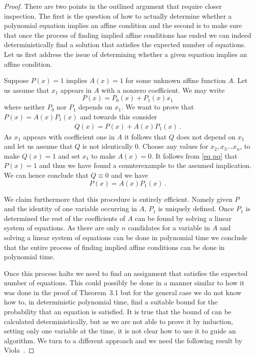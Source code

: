 \begin{proof}
There are two points in the outlined argument
that require closer inspection.  The
first is the question of how to actually determine whether a 
polynomial equation implies an affine condition
and the second is to make sure that once
the process of finding implied affine conditions
has ended we can indeed deterministically find a
solution that satisfies the expected number of
equations.
Let us first address the issue of determining
whether a given equation implies an affine
condition.

Suppose $P(x)=1$ implies $A(x)=1$
for some unknown affine function $A$.
Let us assume that $x_1$ appears in $A$ with
a nonzero coefficient.  
We may write
$$
P(x)=P_0(x)+P_1(x)x_1$$
where neither $P_0$ nor $P_1$ depends on $x_1$.  We want
to prove that $P(x)=A(x)P_1(x)$ and towards this consider
\begin{eqnarray}\label{eq pq}
Q(x)=P(x)+A(x)P_1(x)\,.
\end{eqnarray}
As $x_1$ appears with coefficient one in $A$ it follows
that $Q$ does not depend on $x_1$ and let us assume that
$Q$ is not identically 0.  Choose any values
for $x_2, x_3 \ldots x_n$, to make $Q(x)=1$
and set $x_1$ to make $A(x)=0$.  It follows
from \eqref{eq pq} that $P(x)=1$ 
and thus we have found a counterexample 
to the assumed implication.  We can hence conclude
that $Q\equiv 0$ and we have 
$$
P(x)=A(x) P_1(x)\,.
$$

We claim furthermore that this procedure is entirely
efficient.  Namely given $P$ and the identity of
one variable occurring in $A$, $P_1$ is uniquely
defined.  Once $P_1$ is determined the rest
of the coefficients of $A$ can be found by
solving a linear system of equations.
As there are only $n$ candidates for a variable
in $A$ and solving a linear system of equations
can be done in polynomial time we conclude that the entire
process of finding implied affine conditions
can be done in polynomial time.

Once this process halts we need to find an assignment that satisfies the
expected number of equations.  This could
possibly be done in a manner similar
to how it was done in the proof of Theorem~3.1
but for the general case we do not know how to, in deterministic 
polynomial time,
find a suitable bound for the probability that an equation
is satisfied.  It is true that the bound of 
can be calculated deterministically, but as we are not able to
prove it by induction, setting only one variable at the time,
it is not clear how to use it to guide an algorithm.
We turn to a different approach and we need the following
result by Viola~\cite{viola09}.


\end{proof}
